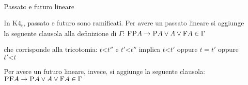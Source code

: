 \documentclass{beamer}
\begin{document}
\setlength{\columnsep}{-17em}
\begin{frame}{Passato e futuro lineare}
    \begin{multicols}{2}
    In K4\textsubscript{t}, passato e futuro sono ramificati.\endgraf\vspace{1em}
    Per avere un passato lineare si aggiunge la seguente clausola alla definizione di $\Gamma$:\endgraf\vspace{1em}
    \centering $\textsc{FP}A \to \textsc{P}A \lor A \lor \textsc{F}A \in \Gamma$\endgraf\vspace{1em}
    \raggedright che corrisponde alla tricotomia:\endgraf\vspace{1em}
    \centering $t \texttt{<} {t''}$ e ${t'} \texttt{<} {t''}$ implica 
    $t \texttt{<} {t'} $ oppure $t = {t'}$ oppure ${t'} \texttt{<} t$\endgraf\vspace{2em}
    \raggedright Per avere un futuro lineare, invece, si aggiunge la seguente clausola:\endgraf\vspace{1em}
    \centering $\textsc{PF}A \to \textsc{P}A \lor A \lor \textsc{F}A \in \Gamma$\endgraf
    \raggedright
    \endgraf
    \columnbreak
    \begin{flushright}
    \end{flushright}
    \end{multicols}
\end{frame}
\setlength{\columnsep}{10pt} %
\end{document}
